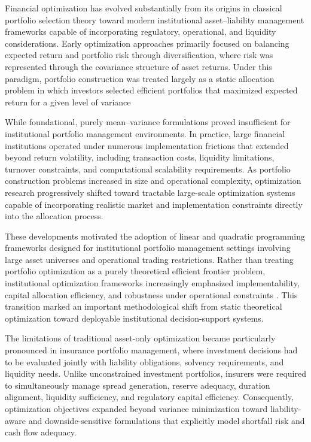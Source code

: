 \documentclass[12pt]{article}
\begin{document}
Financial optimization has evolved substantially from its origins in classical portfolio selection theory toward modern institutional asset--liability management frameworks capable of incorporating regulatory, operational, and liquidity considerations. Early optimization approaches primarily focused on balancing expected return and portfolio risk through diversification, where risk was represented through the covariance structure of asset returns. Under this paradigm, portfolio construction was treated largely as a static allocation problem in which investors selected efficient portfolios that maximized expected return for a given level of variance \parencite{Markowitz1952PortfolioSelection}

While foundational, purely mean--variance formulations proved insufficient for institutional portfolio management environments. In practice, large financial institutions operated under numerous implementation frictions that extended beyond return volatility, including transaction costs, liquidity limitations, turnover constraints, and computational scalability requirements. As portfolio construction problems increased in size and operational complexity, optimization research progressively shifted toward tractable large-scale optimization systems capable of incorporating realistic market and implementation constraints directly into the allocation process.

These developments motivated the adoption of linear and quadratic programming frameworks designed for institutional portfolio management settings involving large asset universes and operational trading restrictions. Rather than treating portfolio optimization as a purely theoretical efficient frontier problem, institutional optimization frameworks increasingly emphasized implementability, capital allocation efficiency, and robustness under operational constraints \parencite{Perold1984Large-ScaleOptimization}. This transition marked an important methodological shift from static theoretical optimization toward deployable institutional decision-support systems.

The limitations of traditional asset-only optimization became particularly pronounced in insurance portfolio management, where investment decisions had to be evaluated jointly with liability obligations, solvency requirements, and liquidity needs. Unlike unconstrained investment portfolios, insurers were required to simultaneously manage spread generation, reserve adequacy, duration alignment, liquidity sufficiency, and regulatory capital efficiency. Consequently, optimization objectives expanded beyond variance minimization toward liability-aware and downside-sensitive formulations that explicitly model shortfall risk and cash flow adequacy.
\end{document}
